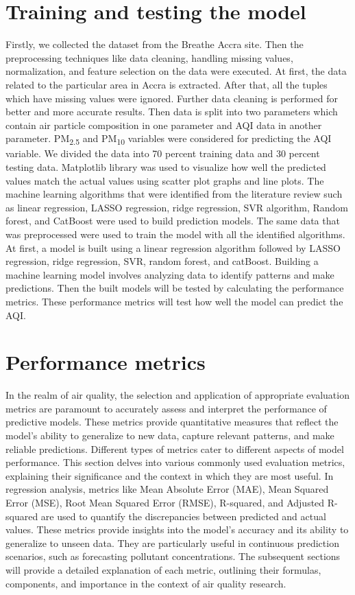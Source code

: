 \documentclass{book}
\numberwithin{equation}{section}
\numberwithin{figure}{section}
\begin{document}
\section{Training and testing the model}
\vspace{-10pt} %
\label{training}
Firstly, we collected the dataset from the Breathe Accra site. Then the preprocessing techniques like data cleaning, handling missing values, normalization, and feature selection on the data were executed. At first, the data related to the particular area in Accra is extracted. After that, all the tuples which have missing values were ignored. Further data cleaning is performed for better and more accurate results. Then data is split into two parameters which contain air particle composition in one parameter and AQI data in another parameter. PM\textsubscript{2.5} and PM\textsubscript{10} variables were considered for predicting the AQI variable. We divided the data into 70 percent training data and 30 percent testing data. Matplotlib library was used to visualize how well the predicted values match the actual values using scatter plot graphs and line plots. The machine learning algorithms that were identified from the literature review such as linear regression, LASSO regression, ridge regression, SVR algorithm, Random forest, and CatBoost were used to build prediction models. The same data that was preprocessed were used to train the model with all the identified algorithms. At first, a model is built using a linear regression algorithm followed by LASSO regression, ridge regression, SVR, random forest, and catBoost. Building a machine learning model involves analyzing data to identify patterns and make predictions. Then the built models will be tested by calculating the performance metrics. These performance metrics will test how well the model can predict the AQI.
\section{Performance metrics}
\label{performance}
In the realm of air quality, the selection and application of appropriate evaluation metrics are paramount to accurately assess and interpret the performance of predictive models. These metrics provide quantitative measures that reflect the model's ability to generalize to new data, capture relevant patterns, and make reliable predictions. Different types of metrics cater to different aspects of model performance. This section delves into various commonly used evaluation metrics, explaining their significance and the context in which they are most useful.
In regression analysis, metrics like Mean Absolute Error (MAE), Mean Squared Error (MSE), Root Mean Squared Error (RMSE), R-squared, and Adjusted R-squared are used to quantify the discrepancies between predicted and actual values. These metrics provide insights into the model's accuracy and its ability to generalize to unseen data. They are particularly useful in continuous prediction scenarios, such as forecasting pollutant concentrations. The subsequent sections will provide a detailed explanation of each metric, outlining their formulas, components, and importance in the context of air quality research.
\vspace{-5mm} %
\end{document}
